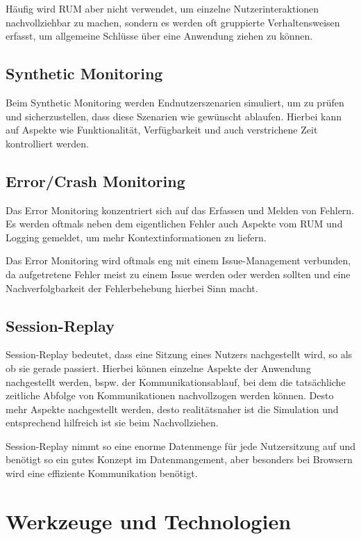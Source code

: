 Häufig wird RUM aber nicht verwendet, um einzelne Nutzerinteraktionen nachvollziehbar zu machen, sondern es werden oft gruppierte Verhaltensweisen erfasst, um allgemeine Schlüsse über eine Anwendung ziehen zu können.

\subsection{Synthetic Monitoring}

Beim Synthetic Monitoring werden Endnutzerszenarien simuliert, um zu prüfen und sicherzustellen, dass diese Szenarien wie gewünscht ablaufen. Hierbei kann auf Aspekte wie Funktionalität, Verfügbarkeit und auch verstrichene Zeit kontrolliert werden.

\subsection{Error/Crash Monitoring}

Das Error Monitoring konzentriert sich auf das Erfassen und Melden von Fehlern. Es werden oftmals neben dem eigentlichen Fehler auch Aspekte vom RUM und Logging gemeldet, um mehr Kontextinformationen zu liefern.

Das Error Monitoring wird oftmals eng mit einem Issue-Management verbunden, da aufgetretene Fehler meist zu einem Issue werden oder werden sollten und eine Nachverfolgbarkeit der Fehlerbehebung hierbei Sinn macht.

\subsection{Session-Replay}

Session-Replay bedeutet, dass eine Sitzung eines Nutzers nachgestellt wird, so als ob sie gerade passiert. Hierbei können einzelne Aspekte der Anwendung nachgestellt werden, bspw. der Kommunikationsablauf, bei dem die tatsächliche zeitliche Abfolge von Kommunikationen nachvollzogen werden können. Desto mehr Aspekte nachgestellt werden, desto realitätsnaher ist die Simulation und entsprechend hilfreich ist sie beim Nachvollziehen.

Session-Replay nimmt so eine enorme Datenmenge für jede Nutzersitzung auf und benötigt so ein gutes Konzept im Datenmangement, aber besonders bei Browsern wird eine effiziente Kommunikation benötigt.

\newpage

\section{Werkzeuge und Technologien}
\label{sec:werkzeuge-und-technologien}

